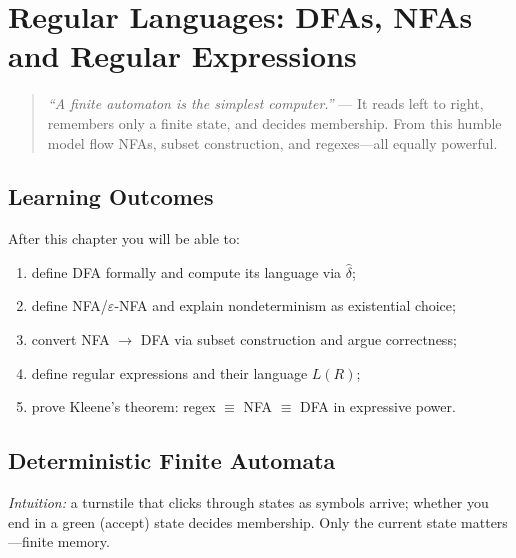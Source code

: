 \chapter{Regular Languages: DFAs, NFAs and Regular Expressions}
\label{ch:regular}

\begin{quote}
\emph{``A finite automaton is the simplest computer.''} --- It reads left to right, remembers only a finite state, and decides membership. From this humble model flow NFAs, subset construction, and regexes---all equally powerful.
\end{quote}

\noindent{}
\vspace{0.4em}

\section*{Learning Outcomes}
After this chapter you will be able to:
\begin{enumerate}[label=(L\arabic*)]
    \item define DFA formally and compute its language via $\hat\delta$;
    \item define NFA/$\varepsilon$-NFA and explain nondeterminism as existential choice;
    \item convert NFA $\to$ DFA via subset construction and argue correctness;
    \item define regular expressions and their language $L(R)$;
    \item prove Kleene's theorem: regex $\equiv$ NFA $\equiv$ DFA in expressive power.
\end{enumerate}

\section{Deterministic Finite Automata}
\label{sec:dfa}
\emph{Intuition:} a turnstile that clicks through states as symbols arrive; whether you end in a green (accept) state decides membership. Only the current state matters---finite memory.

